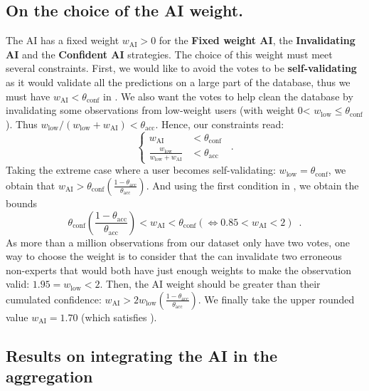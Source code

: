 \subsection{On the choice of the AI weight.}
The AI has a fixed weight $w_\text{AI}>0$ for the \textbf{Fixed weight AI}, the \textbf{Invalidating AI} and the \textbf{Confident AI} strategies.
The choice of this weight must meet several constraints.
First, we would like to avoid the  votes to be \textbf{self-validating} as it would validate all the  predictions on a large part of the database, thus we must have $w_\text{AI}<\theta_\mathrm{conf}$ in .
We also want the  votes to help clean the database by invalidating some observations from low-weight users (with weight 0< $w_\text{low} \leq \theta_\mathrm{conf}$). Thus $w_\text{low} / (w_\text{low} + w_\text{AI}) < \theta_\mathrm{acc}$.
Hence, our constraints read:
\begin{equation}\label{eq:constraint_weight}
\begin{cases} w_\text{AI} &< \theta_\mathrm{conf} \\ \frac{w_\text{low}}{w_\text{low} + w_\text{AI}} &< \theta_\mathrm{acc} \end{cases} \enspace.
\end{equation}
Taking the extreme case where a user becomes self-validating: $w_\text{low}=\theta_\mathrm{conf}$, we obtain that $w_\text{AI} > \theta_\mathrm{conf} \left(\frac{1-\theta_\mathrm{acc}}{\theta_\mathrm{acc}}\right)$. And using the first condition in , we obtain the bounds
\begin{equation}\label{eq:constraint_numerical}
\theta_\mathrm{conf} \left(\frac{1-\theta_\mathrm{acc}}{\theta_\mathrm{acc}}\right) < w_\mathrm{AI} < \theta_\mathrm{conf} \left(\Longleftrightarrow 0.85 < w_\mathrm{AI} < 2 \right)\enspace.
\end{equation}
As more than a million observations from our dataset only have two votes, one way to choose the  weight is to consider that the  can invalidate two erroneous non-experts that would both have just enough weights to make the observation valid: $1.95=w_\text{low} < 2$.
Then, the AI weight should be greater than their cumulated confidence: $w_\mathrm{AI}>2w_\text{low}\left(\frac{1-\theta_\mathrm{acc}}{\theta_\mathrm{acc}}\right)$. We finally take the upper rounded value $w_\mathrm{AI}=1.70$ (which satisfies ).

\subsection{Results on integrating the AI in the aggregation}

